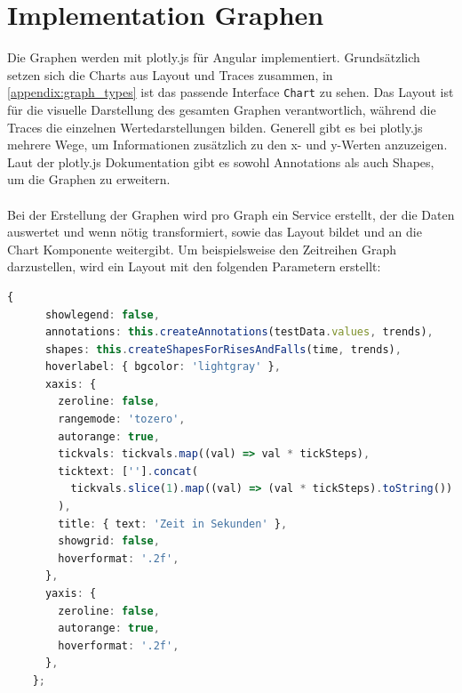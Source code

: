 \section{Implementation Graphen}
Die Graphen werden mit plotly.js für Angular implementiert. Grundsätzlich setzen sich die Charts aus Layout und Traces zusammen, in \ref{appendix:graph_types} ist das passende Interface \texttt{Chart} zu sehen. Das Layout ist für die visuelle Darstellung des gesamten Graphen verantwortlich, während die Traces die einzelnen Wertedarstellungen bilden. Generell gibt es bei plotly.js mehrere Wege, um Informationen zusätzlich zu den x- und y-Werten anzuzeigen. Laut der plotly.js Dokumentation \cite{Plotly.2024b} gibt es sowohl Annotations als auch Shapes, um die Graphen zu erweitern.\\\\ Bei der Erstellung der Graphen wird pro Graph ein Service erstellt, der die Daten auswertet und wenn nötig transformiert, sowie das Layout bildet und an die Chart Komponente weitergibt. Um beispielsweise den Zeitreihen Graph darzustellen, wird ein Layout mit den folgenden Parametern erstellt:
\begin{lstlisting}[language=Typescript]
    {
      showlegend: false,
      annotations: this.createAnnotations(testData.values, trends),
      shapes: this.createShapesForRisesAndFalls(time, trends),
      hoverlabel: { bgcolor: 'lightgray' },
      xaxis: {
        zeroline: false,
        rangemode: 'tozero',
        autorange: true,
        tickvals: tickvals.map((val) => val * tickSteps),
        ticktext: [''].concat(
          tickvals.slice(1).map((val) => (val * tickSteps).toString())
        ),
        title: { text: 'Zeit in Sekunden' },
        showgrid: false,
        hoverformat: '.2f',
      },
      yaxis: {
        zeroline: false,
        autorange: true,
        hoverformat: '.2f',
      },
    };
\end{lstlisting}
